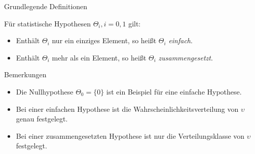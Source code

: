 \documentclass[
  8pt,
  ignorenonframetext,
]{beamer}
\providecommand{\tightlist}{%
  \setlength{\itemsep}{0pt}\setlength{\parskip}{0pt}}
\newcommand{\ups} {\upsilon}
\begin{document}
\begin{frame}{Grundlegende Definitionen}
\protect\hypertarget{grundlegende-definitionen-1}{}
\small
\begin{definition}
\justifying
Für statistische Hypothesen $\Theta_i,i = 0,1$ gilt:
\begin{itemize}
\item Enthält $\Theta_i$ nur ein einziges Element, so heißt $\Theta_i$ \textit{einfach}.
\item Enthält $\Theta_i$ mehr als ein Element, so heißt $\Theta_i$ \textit{zusammengesetzt}.
\end{itemize}
\end{definition}

Bemerkungen

\begin{itemize}
\tightlist
\item
  Die Nullhypothese \(\Theta_0 = \{0\}\) ist ein Beispiel für eine
  einfache Hypothese.
\item
  Bei einer einfachen Hypothese ist die Wahrscheinlichkeitsverteilung
  von \(\ups\) genau festgelegt.
\item
  Bei einer zusammengesetzten Hypothese ist nur die Verteilungsklasse
  von \(\ups\) festgelegt.
\end{itemize}
\end{frame}
\end{document}
